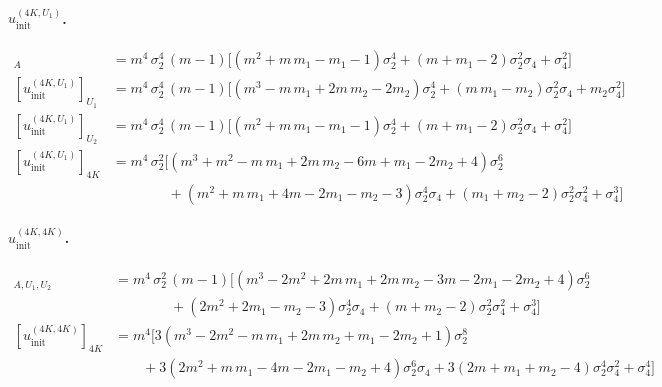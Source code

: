 \documentclass[12pt,a4paper]{article}
\begin{document}
\paragraph{$u^{(4K, U_{1})}_{\mathrm{init}}$.}
\begin{align*}
[u^{(4K, U_{1})}_{\mathrm{init}}]_{A}
  &= m^{4}\,\sigma_{2}^{4}\,(m-1)\bigl[
       (m^{2} + m\,m_{1} - m_{1} - 1)\sigma_{2}^{4}
       + (m + m_{1} - 2)\sigma_{2}^{2}\sigma_{4} + \sigma_{4}^{2}\bigr]\\
[u^{(4K, U_{1})}_{\mathrm{init}}]_{U_{1}}
  &= m^{4}\,\sigma_{2}^{4}\,(m-1)\bigl[
       (m^{3} - m\,m_{1} + 2m\,m_{2} - 2m_{2})\sigma_{2}^{4}
       + (m\,m_{1} - m_{2})\sigma_{2}^{2}\sigma_{4} + m_{2}\sigma_{4}^{2}\bigr]\\
[u^{(4K, U_{1})}_{\mathrm{init}}]_{U_{2}}
  &= m^{4}\,\sigma_{2}^{4}\,(m-1)\bigl[
       (m^{2} + m\,m_{1} - m_{1} - 1)\sigma_{2}^{4}
       + (m + m_{1} - 2)\sigma_{2}^{2}\sigma_{4} + \sigma_{4}^{2}\bigr]\\
[u^{(4K, U_{1})}_{\mathrm{init}}]_{4K}
  &= m^{4}\,\sigma_{2}^{2}\bigl[
       (m^{3} + m^{2} - m\,m_{1} + 2m\,m_{2} - 6m + m_{1} - 2m_{2} + 4)\sigma_{2}^{6}\\
  &\hspace{4em}
       + (m^{2} + m\,m_{1} + 4m - 2m_{1} - m_{2} - 3)\sigma_{2}^{4}\sigma_{4}
       + (m_{1} + m_{2} - 2)\sigma_{2}^{2}\sigma_{4}^{2} + \sigma_{4}^{3}\bigr]
\end{align*}

\paragraph{$u^{(4K, 4K)}_{\mathrm{init}}$.}
\begin{align*}
[u^{(4K, 4K)}_{\mathrm{init}}]_{A, U_{1}, U_{2}}
  &= m^{4}\,\sigma_{2}^{2}\,(m-1)\bigl[
       (m^{3} - 2m^{2} + 2m\,m_{1} + 2m\,m_{2} - 3m - 2m_{1} - 2m_{2} + 4)\sigma_{2}^{6}\\
  &\hspace{4em}
       + (2m^{2} + 2m_{1} - m_{2} - 3)\sigma_{2}^{4}\sigma_{4}
       + (m + m_{2} - 2)\sigma_{2}^{2}\sigma_{4}^{2} + \sigma_{4}^{3}\bigr]\\
[u^{(4K, 4K)}_{\mathrm{init}}]_{4K}
  &= m^{4}\bigl[
       3(m^{3} - 2m^{2} - m\,m_{1} + 2m\,m_{2} + m_{1} - 2m_{2} + 1)\sigma_{2}^{8}\\
  &\hspace{2em}
       + 3(2m^{2} + m\,m_{1} - 4m - 2m_{1} - m_{2} + 4)\sigma_{2}^{6}\sigma_{4}
       + 3(2m + m_{1} + m_{2} - 4)\sigma_{2}^{4}\sigma_{4}^{2} + \sigma_{4}^{4}\bigr]
\end{align*}
\end{document}
